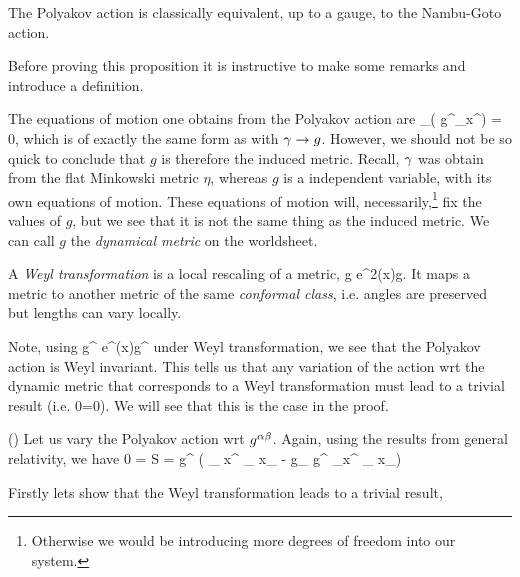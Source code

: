 
\bp 
\label{prop:PolyakovNambuGoto}
The Polyakov action is classically equivalent, up to a gauge, to the Nambu-Goto action. 
\ep 

Before proving this proposition it is instructive to make some remarks and introduce a definition.

\br 
The equations of motion one obtains from the Polyakov action are 
\be 
\label{eqn:EOMDynamicMetric}
    \p_{\a}\Big( g^{\a\beta}\p_{\beta}x^{\mu}\Big) = 0,
\ee 
which is of exactly the same form as  with $\gamma \to g$. However, we should not be so quick to conclude that $g$ is therefore the induced metric. Recall, $\gamma$ was obtain from the flat Minkowski metric $\eta$, whereas $g$ is a independent variable, with its own equations of motion. These equations of motion will, necessarily,\footnote{Otherwise we would be introducing more degrees of freedom into our system.} fix the values of $g$, but we see that it is not the same thing as the induced metric. We can call $g$ the \textit{dynamical metric} on the worldsheet. 
\er 

\bd 
A \textit{Weyl transformation} is a local rescaling of a metric, 
\bse 
    g \to e^{2\phi(x)}g.
\ese 
It maps a metric to another metric of the same \textit{conformal class}, i.e. angles are preserved but lengths can vary locally.
\ed 

\br 
Note, using 
\bse 
    g^{\a\beta} \to e^{\phi(x)}g^{\a\beta} 
\ese 
under Weyl transformation, we see that the Polyakov action is Weyl invariant. This tells us that any variation of the action wrt the dynamic metric that corresponds to a Weyl transformation must lead to a trivial result (i.e. 0=0). We will see that this is the case in the proof. 
\er 

\bq () 
Let us vary the Polyakov action wrt $g^{\alpha\beta}$. Again, using the results from general relativity, we have 
\be 
\label{eqn:PolyakovVariation}
    0 = \del S = \del g^{\a\beta} \Big(  \p_{\a} x^{\mu} \p_{\beta} x_{\mu} - g_{\a\beta}  g^{\rho\g} \p_{\rho}x^{\mu} \p_{\g} x_{\mu}\Big) 
\ee 

Firstly lets show that the Weyl transformation leads to a trivial result, 

